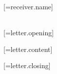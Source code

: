 \documentclass[
    paper=a4,
    foldmarks=pBT,
    firstfoot=false
]{scrlttr2}
\begin{document}
    \begin{letter}{%
        [=receiver.name]\\
        [=receiver.addressStreet]\\
        [=receiver.addressPlace]
    }
        \opening{[=letter.opening]}
        [=letter.content]
        \closing{[=letter.closing]}
    \end{letter}
\end{document}
